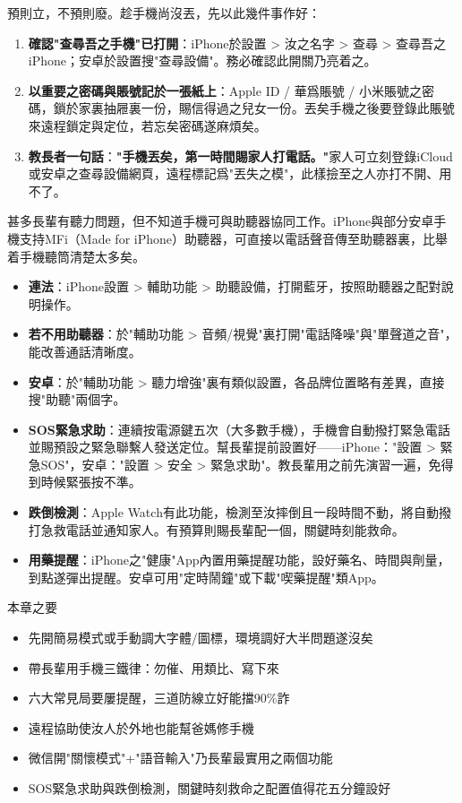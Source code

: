 
預則立，不預則廢。趁手機尚沒丟，先以此幾件事作好：

\begin{enumerate}
  \item \textbf{確認"查尋吾之手機"已打開}：iPhone於設置 > 汝之名字 > 查尋 > 查尋吾之iPhone；安卓於設置搜"查尋設備"。務必確認此開關乃亮着之。
  \item \textbf{以重要之密碼與賬號記於一張紙上}：Apple ID / 華爲賬號 / 小米賬號之密碼，鎖於家裏抽屜裏一份，賜信得過之兒女一份。丟矣手機之後要登錄此賬號來遠程鎖定與定位，若忘矣密碼遂麻煩矣。
  \item \textbf{教長者一句話}：\textbf{"手機丟矣，第一時間賜家人打電話。"}家人可立刻登錄iCloud或安卓之查尋設備網頁，遠程標記爲"丟失之模"，此樣撿至之人亦打不開、用不了。
\end{enumerate}


甚多長輩有聽力問題，但不知道手機可與助聽器協同工作。iPhone與部分安卓手機支持MFi（Made for iPhone）助聽器，可直接以電話聲音傳至助聽器裏，比舉着手機聽筒清楚太多矣。

\begin{itemize}
  \item \textbf{連法}：iPhone設置 > 輔助功能 > 助聽設備，打開藍牙，按照助聽器之配對說明操作。
  \item \textbf{若不用助聽器}：於"輔助功能 > 音頻/視覺"裏打開"電話降噪"與"單聲道之音"，能改善通話清晰度。
  \item \textbf{安卓}：於"輔助功能 > 聽力增強"裏有類似設置，各品牌位置略有差異，直接搜"助聽"兩個字。
\end{itemize}


\begin{itemize}
  \item \textbf{SOS緊急求助}：連續按電源鍵五次（大多數手機），手機會自動撥打緊急電話並賜預設之緊急聯繫人發送定位。幫長輩提前設置好——iPhone："設置 > 緊急SOS"，安卓："設置 > 安全 > 緊急求助"。教長輩用之前先演習一遍，免得到時候緊張按不準。
  \item \textbf{跌倒檢測}：Apple Watch有此功能，檢測至汝摔倒且一段時間不動，將自動撥打急救電話並通知家人。有預算則賜長輩配一個，關鍵時刻能救命。
  \item \textbf{用藥提醒}：iPhone之"健康"App內置用藥提醒功能，設好藥名、時間與劑量，到點遂彈出提醒。安卓可用"定時鬧鐘"或下載"喫藥提醒"類App。
\end{itemize}

\begin{tcbsummary}{本章之要}
\begin{itemize}
  \item 先開簡易模式或手動調大字體/圖標，環境調好大半問題遂沒矣
  \item 帶長輩用手機三鐵律：勿催、用類比、寫下來
  \item 六大常見局要屢提醒，三道防線立好能擋90\%詐
  \item 遠程協助使汝人於外地也能幫爸媽修手機
  \item 微信開"關懷模式"+"語音輸入"乃長輩最實用之兩個功能
  \item SOS緊急求助與跌倒檢測，關鍵時刻救命之配置值得花五分鐘設好
\end{itemize}

\end{tcbsummary}
